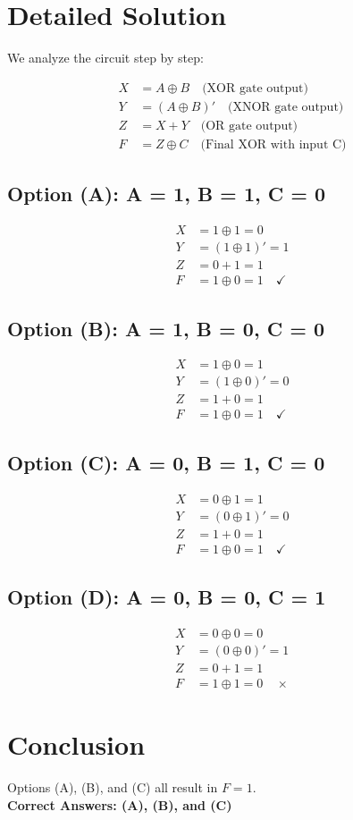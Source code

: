 \documentclass[12pt]{article}
\begin{document}
\section*{Detailed Solution}

We analyze the circuit step by step:

\begin{align*}
X &= A \oplus B \quad \text{(XOR gate output)} \\
Y &= (A \oplus B)' \quad \text{(XNOR gate output)} \\
Z &= X + Y \quad \text{(OR gate output)} \\
F &= Z \oplus C \quad \text{(Final XOR with input C)}
\end{align*}

\subsection*{Option (A): A = 1, B = 1, C = 0}
\begin{align*}
X &= 1 \oplus 1 = 0 \\
Y &= (1 \oplus 1)' = 1 \\
Z &= 0 + 1 = 1 \\
F &= 1 \oplus 0 = 1 \quad \checkmark
\end{align*}

\subsection*{Option (B): A = 1, B = 0, C = 0}
\begin{align*}
X &= 1 \oplus 0 = 1 \\
Y &= (1 \oplus 0)' = 0 \\
Z &= 1 + 0 = 1 \\
F &= 1 \oplus 0 = 1 \quad \checkmark
\end{align*}

\subsection*{Option (C): A = 0, B = 1, C = 0}
\begin{align*}
X &= 0 \oplus 1 = 1 \\
Y &= (0 \oplus 1)' = 0 \\
Z &= 1 + 0 = 1 \\
F &= 1 \oplus 0 = 1 \quad \checkmark
\end{align*}

\subsection*{Option (D): A = 0, B = 0, C = 1}
\begin{align*}
X &= 0 \oplus 0 = 0 \\
Y &= (0 \oplus 0)' = 1 \\
Z &= 0 + 1 = 1 \\
F &= 1 \oplus 1 = 0 \quad \times
\end{align*}

\section*{Conclusion}
Options (A), (B), and (C) all result in \( F = 1 \). \\

\textbf{Correct Answers: (A), (B), and (C)}
\end{document}
